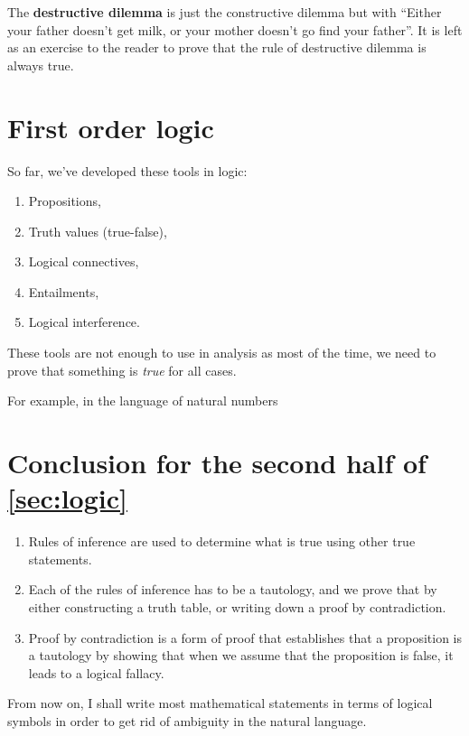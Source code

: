 The \textbf{destructive dilemma} is just the constructive dilemma but with \enquote{Either your father doesn't get milk, or your mother doesn't go find your father}. It is left as an exercise to the reader to prove that the rule of destructive dilemma is always true.

\section{First order logic}

So far, we've developed these tools in logic:
\begin{enumerate}
  \item Propositions,
  \item Truth values (true-false),
  \item Logical connectives,
  \item Entailments,
  \item Logical interference.
\end{enumerate}
These tools are not enough to use in analysis as most of the time, we need to prove that something is \emph{true} for all cases.

For example, in the language of natural numbers

\section{Conclusion for the second half of \cref{sec:logic}}

\begin{enumerate}[noitemsep]
  \item Rules of inference are used to determine what is true using other true statements.
  \item Each of the rules of inference has to be a tautology, and we prove that by either constructing a truth table, or writing down a proof by contradiction.
  \item Proof by contradiction is a form of proof that establishes that a proposition is a tautology by showing that when we assume that the proposition is false, it leads to a logical fallacy.
\end{enumerate}

From now on, I shall write most mathematical statements in terms of logical symbols in order to get rid of ambiguity in the natural language.

